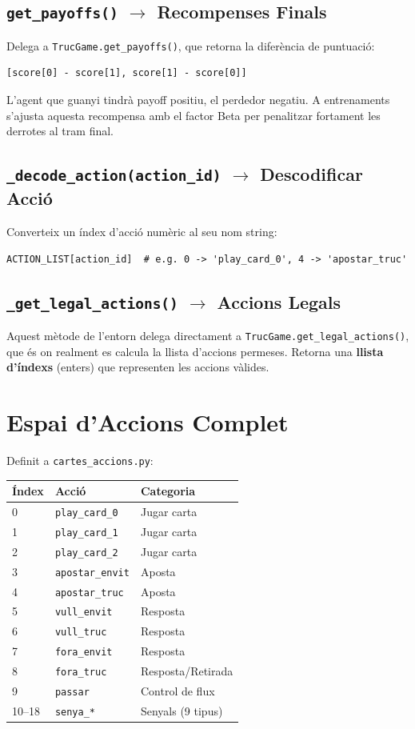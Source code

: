 \documentclass[a4paper,11pt]{report}
\begin{document}
\subsection{\texttt{get\_payoffs()} $\rightarrow$ Recompenses Finals}

Delega a \texttt{TrucGame.get\_payoffs()}, que retorna la diferència de puntuació:
\begin{lstlisting}
[score[0] - score[1], score[1] - score[0]]
\end{lstlisting}
L'agent que guanyi tindrà payoff positiu, el perdedor negatiu. A entrenaments s'ajusta aquesta recompensa amb el factor Beta per penalitzar fortament les derrotes al tram final.

\subsection{\texttt{\_decode\_action(action\_id)} $\rightarrow$ Descodificar Acció}

Converteix un índex d'acció numèric al seu nom string:
\begin{lstlisting}
ACTION_LIST[action_id]  # e.g. 0 -> 'play_card_0', 4 -> 'apostar_truc'
\end{lstlisting}

\subsection{\texttt{\_get\_legal\_actions()} $\rightarrow$ Accions Legals}

Aquest mètode de l'entorn delega directament a \texttt{TrucGame.get\_legal\_actions()}, que és on realment es calcula la llista d'accions permeses. Retorna una \textbf{llista d'índexs} (enters) que representen les accions vàlides.

\section{Espai d'Accions Complet}

Definit a \texttt{cartes\_accions.py}:

\begin{longtable}{|l|l|l|}
\hline
\textbf{Índex} & \textbf{Acció} & \textbf{Categoria} \\
\hline
0 & \texttt{play\_card\_0} & Jugar carta \\
1 & \texttt{play\_card\_1} & Jugar carta \\
2 & \texttt{play\_card\_2} & Jugar carta \\
3 & \texttt{apostar\_envit} & Aposta \\
4 & \texttt{apostar\_truc} & Aposta \\
5 & \texttt{vull\_envit} & Resposta \\
6 & \texttt{vull\_truc} & Resposta \\
7 & \texttt{fora\_envit} & Resposta \\
8 & \texttt{fora\_truc} & Resposta/Retirada \\
9 & \texttt{passar} & Control de flux \\
10--18 & \texttt{senya\_*} & Senyals (9 tipus) \\
\hline
\end{longtable}
\end{document}
